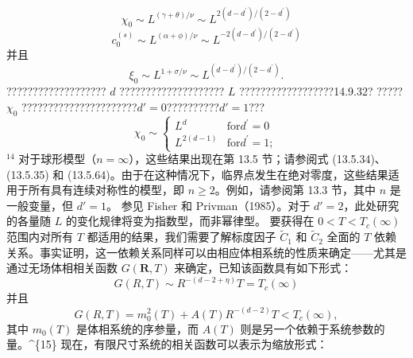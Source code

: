 \begin{equation}\tag{14.4.84}\label{eq:14.4.84}
\chi _ { 0 } \sim L ^{( \gamma + \theta ) / \nu} \sim L ^{2 ( d - d ^ { \prime} ) / ( 2 - d ^{\prime} ) }
\end{equation}
\begin{equation}\tag{14.4.85}\label{eq:14.4.85}
c _ { 0 } ^{( s )} \sim L ^{( \alpha + \phi ) / \nu} \sim L ^{- 2 ( d - d ^ { \prime} ) / ( 2 - d ^{\prime} ) }
\end{equation}
并且
\begin{equation}\tag{14.4.86}\label{eq:14.4.86}
\xi _ { 0 } \sim L ^{1 + \sigma / \nu} \sim L ^{( d - d ^ { \prime} ) / ( 2 - d ^{\prime} ) } .
\end{equation}
??????????????????? \(d\) ???????????????????? \(L\) ??????????????????14.9.32? ????? \(\chi_0\) ??????????????????????\(d\prime=0\)??????????\(d\prime=1\)???
\begin{equation}\tag{14.4.87}\label{eq:14.4.87}
\chi _ { 0 } \sim \left\{ \begin{array}{ll} { L ^{d} } & { \mathrm { f o r }  d ^{\prime} = 0 } \\{ L ^{2 ( d - 1 )} } & { \mathrm { f o r }  d ^{\prime} = 1 ; } \end{array} \right.
\end{equation}
\(^{14}\) 对于球形模型（\(n=\infty\)），这些结果出现在第 13.5 节；请参阅式 (13.5.34)、(13.5.35) 和 (13.5.64)。由于在这种情况下，临界点发生在绝对零度，这些结果适用于所有具有连续对称性的模型，即 \(n \geq 2\)。例如，请参阅第 13.3 节，其中 \(n\) 是一般变量，但 \(d'=1\)。
参见 Fisher 和 Privman（1985）。对于 \(d'=2\)，此处研究的各量随 \(L\) 的变化规律将变为指数型，而非幂律型。
要获得在 \(0 < T < T_{c}(\infty)\) 范围内对所有 \(T\) 都适用的结果，我们需要了解标度因子 \(\tilde{C}_{1}\) 和 \(\tilde{C}_{2}\) 全面的 \(T\) 依赖关系。事实证明，这一依赖关系同样可以由相应体相系统的性质来确定——尤其是通过无场体相相关函数 \(G(\boldsymbol{R},T)\) 来确定，已知该函数具有如下形式：
\begin{equation}\tag{14.4.88}\label{eq:14.4.88}
G ( R , T ) \sim R ^{- ( d - 2 + \eta )}  T = T _ { c } ( \infty )
\end{equation}
并且
\begin{equation}\tag{14.4.89}\label{eq:14.4.89}
G ( R , T ) = m _ { 0 } ^{2} ( T ) + A ( T ) R ^{- ( d - 2 )}  T < T _ { c } ( \infty ) ,
\end{equation}
其中 \(m_{0}(T)\) 是体相系统的序参量，而 \(A(T)\) 则是另一个依赖于系统参数的量。\^{}\{15\} 现在，有限尺寸系统的相关函数可以表示为缩放形式：
